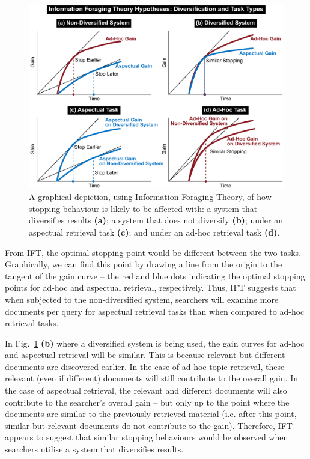 \begin{figure}[t!]
\begin{center}
        \includegraphics[width=\textwidth]{figures/ift-non-div-fromthesis.pdf}
        \vspace{-2mm}
    \caption{A graphical depiction, using Information Foraging Theory, of how stopping behaviour is likely to be affected with: a system that diversifies results \textbf{(a)}; a system that does not diversify \textbf{(b)}; under an aspectual retrieval task \textbf{(c)}; and under an ad-hoc retrieval task \textbf{(d)}.} \label{fig_ift_patches}    
    \vspace{-6mm}
\end{center}
\end{figure}


From IFT, the optimal stopping point would be different between the two tasks. Graphically, we can find this point by drawing a line from the origin to the tangent of the gain curve -- the red and blue dots indicating the optimal stopping points for ad-hoc and aspectual retrieval, respectively. Thus, IFT suggests that when subjected to the non-diversified system, searchers will examine more documents per query for aspectual retrieval tasks than when compared to ad-hoc retrieval tasks.

In Fig.~\ref{fig_ift_patches} \textbf{(b)} where a diversified system is being used, the gain curves for ad-hoc and aspectual retrieval will be similar. This is because relevant but different documents are discovered earlier. In the case of ad-hoc topic retrieval, these relevant (even if different) documents will still contribute to the overall gain. In the case of aspectual retrieval, the relevant and different documents will also contribute to the searcher's overall gain -- but only up to the point where the documents are similar to the previously retrieved material (i.e. after this point, similar but relevant documents do not contribute to the gain). Therefore, IFT appears to suggest that similar stopping behaviours would be observed when searchers utilise a system that diversifies results.

